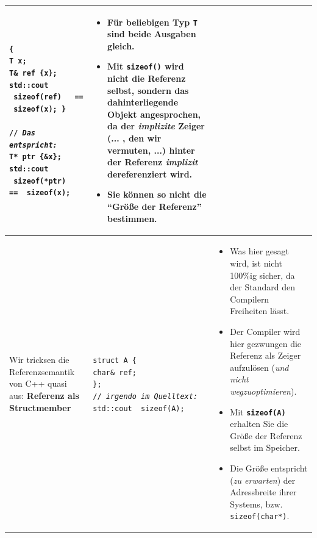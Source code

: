 \documentclass[a4paper]{report}
\begin{document}
\begin{center}
\begin{tabular}{|M{3cm}|L{4.5cm}|M{8cm}|}
			\texttt{\{\newline T x; \newline T\& ref \{x\}; \newline std::cout \cout\ sizeof(ref) \cout\ \textquotedbl \vspace{1ex} == \textquotedbl \vspace{1ex} \cout\ sizeof(x); \} \newline \newline // \textit{Das entspricht:} \newline T* ptr \{\&x\}; \newline std::cout \cout\ sizeof(*ptr) \cout\ \textquotedbl \vspace{1ex} == \textquotedbl \vspace{1ex} \cout\ sizeof(x);} &
			\begin{itemize}
				\item Für beliebigen Typ \texttt{T} sind beide Ausgaben gleich.
				\item Mit \texttt{sizeof()} wird nicht die Referenz selbst, sondern das dahinterliegende Objekt angesprochen, da der \textit{implizite} Zeiger (... , den wir vermuten, ...) hinter der Referenz \textit{implizit} dereferenziert wird.
				\item Sie können so nicht die "`Größe der Referenz"' bestimmen.
			\end{itemize} \\ \hline
		Wir tricksen die Referenzsemantik von C++ quasi aus: \newline \textbf{Referenz als Structmember} &
			\texttt{struct A \{\newline \vspace{3ex} char\& ref;\newline \}; \newline // \textit{irgendo im Quelltext:} \newline std::cout \cout\ sizeof(A); \newline} &
			\begin{itemize}
				\item Was hier gesagt wird, ist nicht 100\%ig sicher, da der Standard den Compilern Freiheiten lässt.
				\item Der Compiler wird hier gezwungen die Referenz als Zeiger aufzulösen (\textit{und nicht wegzuoptimieren}).
				\item Mit \texttt{\textbf{sizeof(A)}} erhalten Sie die Größe der Referenz selbst im Speicher.
				\item Die Größe entspricht (\textit{zu erwarten}) der Adressbreite ihrer Systems, bzw. \texttt{sizeof(char*)}.
			\end{itemize} \\ \hline
	\end{tabular}
\end{center}
\end{document}
